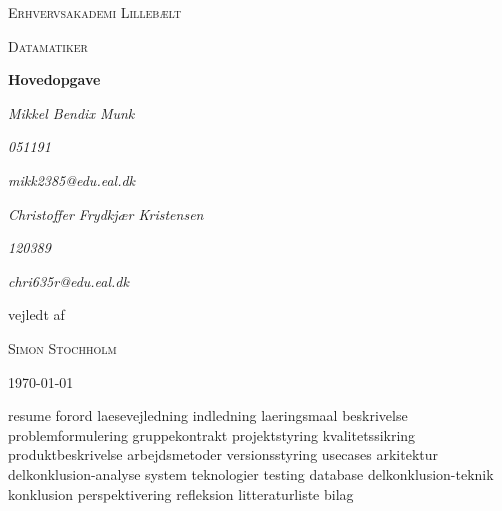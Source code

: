 \documentclass[a4paper, 11pt, danish]{article}
\begin{document}
\begin{titlepage}
    \centering
    {\scshape\LARGE Erhvervsakademi Lillebælt \par}
    \vspace{1cm}
    {\scshape\Large Datamatiker\par}
    \vspace{1.5cm}
    {\huge\bfseries Hovedopgave\par}
    \vspace{2cm}
    {\Large\itshape Mikkel Bendix Munk\par}
    {\small\itshape 051191\par}
    {\small\itshape mikk2385@edu.eal.dk\par}
    {\Large\itshape Christoffer Frydkjær Kristensen\par}
    {\small\itshape 120389\par}
    {\small\itshape chri635r@edu.eal.dk\par}
    \vfill
    vejledt af\par
    \textsc{Simon Stochholm}

    \vfill

    {\large \today\par}
\end{titlepage}
\tableofcontents{}
\newpage
{resume}
{forord}
{laesevejledning}
{indledning}
{laeringsmaal}
{beskrivelse}
{problemformulering}
{gruppekontrakt}
{projektstyring}
{kvalitetssikring}
{produktbeskrivelse}
{arbejdsmetoder}
{versionsstyring}
{usecases}
{arkitektur}
{delkonklusion-analyse}
{system}
{teknologier}
{testing}
{database}
{delkonklusion-teknik}
{konklusion}
{perspektivering}
{refleksion}
{litteraturliste}
{bilag}
\end{document}
